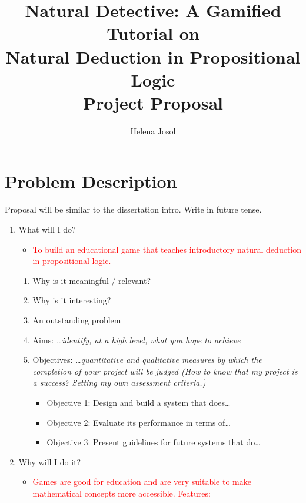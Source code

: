 \documentclass[a4paper,11pt]{article}
\title{Natural Detective: A Gamified Tutorial on \\ Natural Deduction in Propositional Logic \\ \medskip \Large{Project Proposal}}
\author{Helena Josol \autocite{adjl-blog}}
\date{}
\newcommand{\draft}[1]{\textcolor{red}{#1}} %
\begin{document}
\maketitle


\section{Problem Description} %
Proposal will be similar to the dissertation intro. Write in future tense.
\begin{enumerate}
  \item What will I do?
    \begin{itemize}
      \item \draft{To build an educational game that teaches introductory natural deduction in propositional logic.}
    \end{itemize}
    \begin{enumerate}
      \item Why is it meaningful / relevant?
      \item Why is it interesting?
      \item An outstanding problem
      \item Aims: \textit{\dots identify, at a high level, what you hope to achieve}
      \item Objectives: \textit{\dots quantitative and qualitative measures by which the completion of your project will be judged (How to know that my project is a success? Setting my own assessment criteria.)}
        \begin{itemize}
          \item Objective 1: Design and build a system that does\dots
          \item Objective 2: Evaluate its performance in terms of\dots
          \item Objective 3: Present guidelines for future systems that do\dots
        \end{itemize}
    \end{enumerate}
  \item Why will I do it?
    \begin{itemize}
      \item \draft{Games are good for education and are very suitable to make mathematical concepts more accessible. Features:}
      \begin{itemize}

\end{itemize}
\end{itemize}
\end{enumerate}
\end{document}

